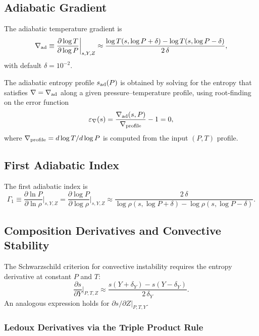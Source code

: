 \documentclass[twocolumn]{aastex701}
\begin{document}
\subsection{Adiabatic Gradient}

The adiabatic temperature gradient is
\begin{equation}\label{eq:nabla_ad}
    \nabla_{\rm ad} \equiv \frac{\partial \log T}{\partial \log P}\bigg|_{s,Y,Z} \approx \frac{\log T(s, \log P + \delta) - \log T(s, \log P - \delta)}{2\,\delta},
\end{equation}
with default $\delta = 10^{-2}$.

The adiabatic entropy profile $s_{\rm ad}(P)$ is obtained by solving for the entropy that satisfies $\nabla = \nabla_{\rm ad}$ along a given pressure--temperature profile, using root-finding on the error function
\begin{equation}
    \varepsilon_{\nabla}(s) = \frac{\nabla_{\rm ad}(s, P)}{\nabla_{\rm profile}} - 1 = 0,
\end{equation}
where $\nabla_{\rm profile} = d\log T / d\log P$ is computed from the input $(P,T)$ profile.

\subsection{First Adiabatic Index}

The first adiabatic index is
\begin{equation}\label{eq:gamma1}
    \Gamma_1 \equiv \frac{\partial \ln P}{\partial \ln \rho}\bigg|_{s,Y,Z} = \frac{\partial \log P}{\partial \log \rho}\bigg|_{s,Y,Z} \approx \frac{2\,\delta}{\log\rho(s, \log P + \delta) - \log\rho(s, \log P - \delta)}.
\end{equation}

\subsection{Composition Derivatives and Convective Stability}\label{sec:composition}

The Schwarzschild criterion for convective instability requires the entropy derivative at constant $P$ and $T$:
\begin{equation}
    \frac{\partial s}{\partial Y}\bigg|_{P,T,Z} \approx \frac{s(Y + \delta_Y) - s(Y - \delta_Y)}{2\,\delta_Y}.
\end{equation}
An analogous expression holds for $\partial s/\partial Z|_{P,T,Y}$.

\subsubsection{Ledoux Derivatives via the Triple Product Rule}
\end{document}
